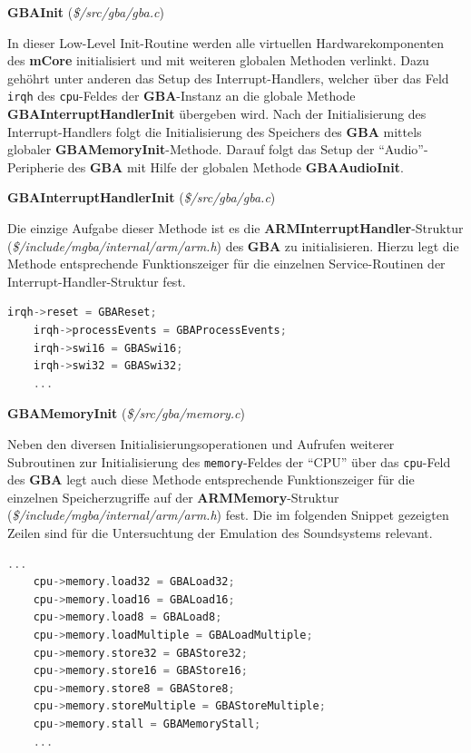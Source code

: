 \documentclass[11pt,a4paper]{scrartcl}
\newcommand{\paratitlecode}[2] {
    \vspace{5mm}
    \large \textbf{#1} \normalsize(\textit{\${#2}})
    \vspace{2mm}\newline
}
\begin{document}
\newpage
\paratitlecode{GBAInit}{/src/gba/gba.c}
In dieser Low-Level Init-Routine werden alle virtuellen Hardwarekomponenten des \textbf{mCore} initialisiert und mit weiteren globalen Methoden verlinkt. Dazu geh\"ohrt unter anderen das Setup des Interrupt-Handlers, welcher \"uber das Feld \verb|irqh| des \verb|cpu|-Feldes der \textbf{GBA}-Instanz an die globale Methode \textbf{GBAInterruptHandlerInit} \"ubergeben wird. Nach der Initialisierung des Interrupt-Handlers folgt die Initialisierung des Speichers des \textbf{GBA} mittels globaler \textbf{GBAMemoryInit}-Methode. Darauf folgt das Setup der \enquote{Audio}-Peripherie des \textbf{GBA} mit Hilfe der globalen Methode \textbf{GBAAudioInit}.

\paratitlecode{GBAInterruptHandlerInit}{/src/gba/gba.c}
Die einzige Aufgabe dieser Methode ist es die \textbf{ARMInterruptHandler}-Struktur (\textit{\$/include/mgba/internal/arm/arm.h}) des \textbf{GBA} zu initialisieren. Hierzu legt die Methode entsprechende Funktionszeiger f\"ur die einzelnen Service-Routinen der Interrupt-Handler-Struktur fest.

\vspace{5mm}
\begin{lstlisting}[language=C++, caption={Ausschnitt aus der \textbf{GBAInterruptHandlerInit}-Methode}, label={list:GBAInterruptHandlerInit}]
    irqh->reset = GBAReset;
    irqh->processEvents = GBAProcessEvents;
    irqh->swi16 = GBASwi16;
    irqh->swi32 = GBASwi32;
    ...
\end{lstlisting}


\paratitlecode{GBAMemoryInit}{/src/gba/memory.c}
Neben den diversen Initialisierungsoperationen und Aufrufen weiterer Subroutinen zur Initialisierung des \verb|memory|-Feldes der \enquote{CPU} \"uber das \verb|cpu|-Feld des \textbf{GBA} legt auch diese Methode entsprechende Funktionszeiger f\"ur die einzelnen Speicherzugriffe auf der \textbf{ARMMemory}-Struktur (\textit{\$/include/mgba/internal/arm/arm.h}) fest. Die im folgenden Snippet gezeigten Zeilen sind f\"ur die Untersuchtung der Emulation des Soundsystems relevant.

\vspace{5mm}
\begin{lstlisting}[language=C++, caption={Ausschnitt aus der \textbf{GBAMemoryInit}-Methode}, label={list:GBAMemoryInit}]
    ...
    cpu->memory.load32 = GBALoad32;
    cpu->memory.load16 = GBALoad16;
    cpu->memory.load8 = GBALoad8;
    cpu->memory.loadMultiple = GBALoadMultiple;
    cpu->memory.store32 = GBAStore32;
    cpu->memory.store16 = GBAStore16;
    cpu->memory.store8 = GBAStore8;
    cpu->memory.storeMultiple = GBAStoreMultiple;
    cpu->memory.stall = GBAMemoryStall;
    ...
\end{lstlisting}
\end{document}
